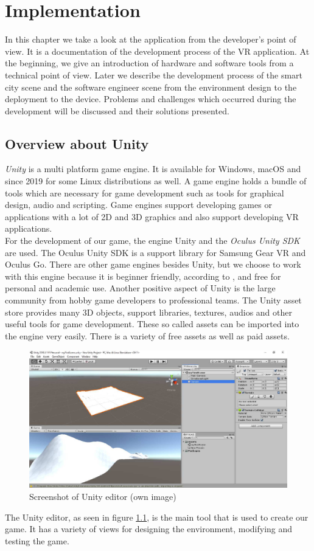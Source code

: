 \chapter{Implementation} \label{implementation}
In this chapter we take a look at the application from the developer's point of view. It is a documentation of the development process of the VR application. At the beginning, we give an introduction of hardware and software tools from a technical point of view. Later we describe the development process of the smart city scene and the software engineer scene from the environment design to the deployment to the device. Problems and challenges which occurred during the development will be discussed and their solutions presented.

\section{Overview about Unity}
\textit{Unity} is a multi platform game engine. It is available for Windows, macOS and since 2019 for some Linux distributions as well. A game engine holds a bundle of tools which are necessary for game development such as tools for graphical design, audio and scripting. Game engines support developing games or applications with a lot of 2D and 3D graphics and also support developing VR applications. \cite{Dickson.2017}\\
For the development of our game, the engine Unity and the \textit{Oculus Unity SDK} are used. The Oculus Unity SDK is a support library for Samsung Gear VR and Oculus Go. There are other game engines besides Unity, but we choose to work with this engine because it is beginner friendly, according to \cite{Dickson.2017}, and free for personal and academic use. Another positive aspect of Unity is the large community from hobby game developers to professional teams. The Unity asset store provides many 3D objects, support libraries, textures, audios and other useful tools for game development. These so called assets can be imported into the engine very easily. There is a variety of free assets as well as paid assets.\\
\begin{figure}[h!]
  \includegraphics[width=16cm]{kapitel/eps/editor.pdf}
  \centering
  \caption{Screenshot of Unity editor (own image)}
  \label{fig:unity-editor}
\end{figure}The Unity editor, as seen in figure \ref{fig:unity-editor}, is the main tool that is used to create our game. It has a variety of views for designing the environment, modifying and testing the game. \\
